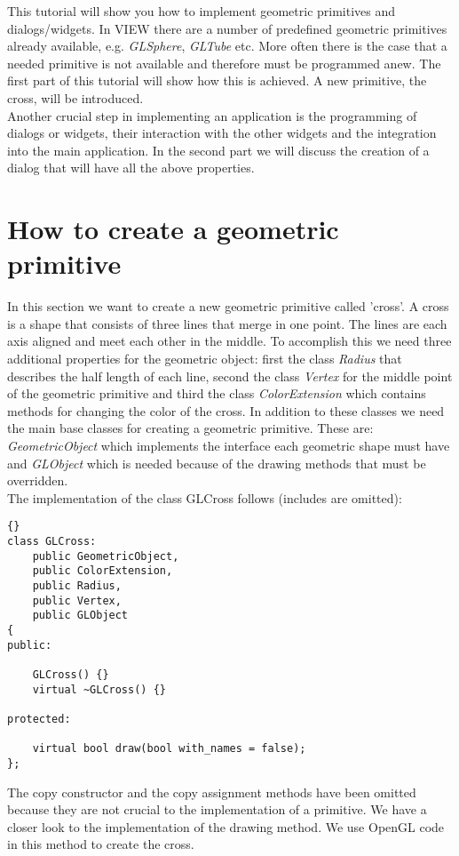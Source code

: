 
This tutorial will show you how to implement geometric primitives and dialogs/widgets.
In VIEW there are a number of predefined geometric primitives already available,
e.g. {\em GLSphere}, {\em GLTube} etc. More often there is the case that a needed
primitive is not available and therefore must be programmed anew. The first part
of this tutorial will show how this is achieved. A new primitive, the cross, will
be introduced.\\
Another crucial step in implementing an application is the programming of
dialogs or widgets, their interaction with the other widgets and the integration into
the main application. In the second part we will discuss the creation of a dialog 
that will have all the above properties.

\section{How to create a geometric primitive}
\label{section:view_create_a_geometric_primitive}

In this section we want to create a new geometric primitive called 'cross'.
A cross is a shape that consists of three lines that merge in one point.
The lines are each axis aligned and meet each other in the middle.
To accomplish this we need three additional properties for the geometric object:
first the class {\em Radius} that describes the half length of each line,
second the class {\em Vertex} for the middle point of the geometric primitive
and third the class {\em ColorExtension} which contains methods for changing
the color of the cross.
In addition to these classes we need the main base classes for creating a geometric
primitive. These are: {\em GeometricObject} which implements the interface each
geometric shape must have and {\em GLObject} which is needed because of the drawing
methods that must be overridden.\\
The implementation of the class GLCross follows (includes are omitted):

\begin{lstlisting}{}
class GLCross: 
	public GeometricObject,
	public ColorExtension,
	public Radius,
	public Vertex,
	public GLObject
{
public:

	GLCross() {}
	virtual ~GLCross() {}

protected:

	virtual bool draw(bool with_names = false);
};
\end{lstlisting}

The copy constructor and the copy assignment methods have been omitted because
they are not crucial to the implementation of a primitive. 
We have a closer look to the implementation of the drawing method.
We use OpenGL code in this method to create the cross.

